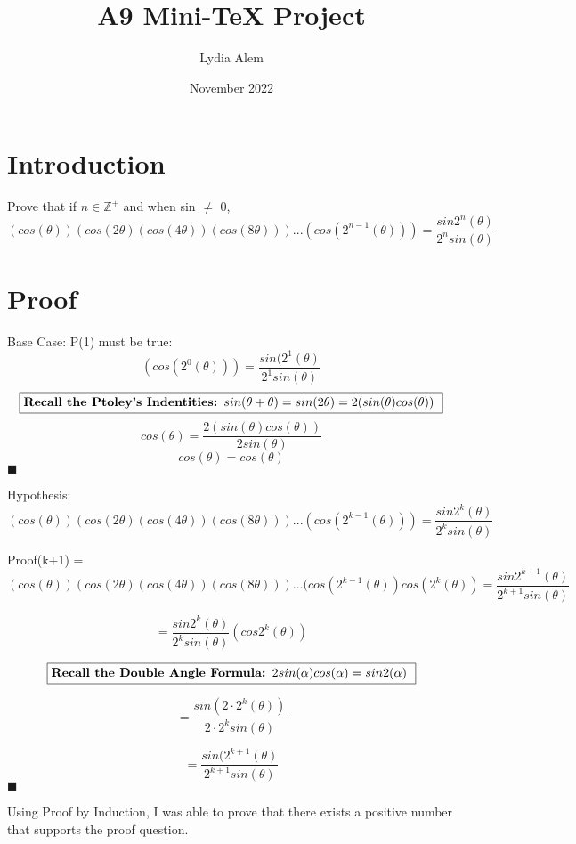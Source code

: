 \documentclass{article}
\title{A9 Mini-TeX Project}
\author{Lydia Alem}
\date{November 2022}
\begin{document}
\maketitle

\section{Introduction}
Prove that if $n \in \mathbb{Z}^{+}$  and when sin $\not=$ 0,
$$(cos(\theta))(cos(2\theta)(cos(4\theta))(cos(8\theta)))...(cos(2^{n-1}(\theta))) = \frac{sin2^{n}(\theta)}{2^{n}sin(\theta)}$$


\section{Proof}
Base Case: P(1) must be true: $$(cos(2^{0}(\theta))) = \frac{sin(2^{1}(\theta)}{2^{1} 
sin(\theta)}$$ $$\fbox{\textbf{Recall the Ptoley's Indentities: $sin(\theta + \theta) = sin(2\theta) = 2(sin(\theta) cos(\theta))$ }}$$
$$cos(\theta) = \frac{2(sin(\theta)cos(\theta))}{2sin(\theta)}$$
$$cos(\theta) = cos(\theta) $$
$ \blacksquare $ %

Hypothesis: 
$$ (cos(\theta))(cos(2\theta)(cos(4\theta))(cos(8\theta)))...(cos(2^{k-1}(\theta))) = \frac{sin2^{k}(\theta)}{2^{k}sin(\theta)}$$

Proof(k+1) = 
$$ (cos(\theta))(cos(2\theta)(cos(4\theta))(cos(8\theta)))...(cos(2^{k-1}(\theta))cos(2^{k}(\theta)) = \frac{sin2^{k+1}(\theta)}{2^{k+1}sin(\theta)}$$

$$ =\frac{sin2^{k}(\theta)}{2^{k}sin(\theta)}(cos2^{k}(\theta))$$

$$\fbox{\textbf{Recall the Double Angle Formula: $2sin(\alpha)cos(\alpha) = sin2(\alpha)$ }}$$



$$= \frac{sin(2\cdot2^{k}(\theta))}{2\cdot2^{k}sin(\theta)}$$


$$= \frac{sin(2^{k+1}(\theta)}{2^{k+1}sin(\theta)}$$
$ \blacksquare $ 


Using Proof by Induction, I was able to prove that there exists a positive number that supports the proof question. 
\end{document}
